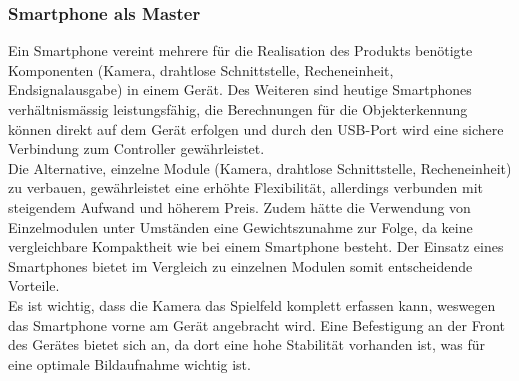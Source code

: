 \subsubsection{Smartphone als Master}
	Ein Smartphone vereint mehrere für die Realisation des Produkts benötigte Komponenten (Kamera, drahtlose Schnittstelle, Recheneinheit, Endsignalausgabe) 
	in einem Gerät. Des Weiteren sind heutige Smartphones verhältnismässig leistungsfähig, die Berechnungen für die Objekterkennung 
	können direkt auf dem Gerät erfolgen und durch den USB-Port wird eine sichere Verbindung zum Controller gewährleistet.\\
	Die Alternative, einzelne Module (Kamera, drahtlose Schnittstelle, Recheneinheit) zu verbauen, 
	gewährleistet eine erhöhte Flexibilität, allerdings verbunden mit steigendem Aufwand und höherem Preis. 
	Zudem hätte die Verwendung von Einzelmodulen unter Umständen eine Gewichtszunahme zur Folge, da keine vergleichbare Kompaktheit wie bei einem Smartphone besteht. 
	Der Einsatz eines Smartphones bietet im Vergleich zu einzelnen Modulen somit entscheidende Vorteile.\\
	Es ist wichtig, dass die Kamera das Spielfeld komplett erfassen kann, weswegen das Smartphone vorne am Gerät angebracht wird. 
	Eine Befestigung an der Front des Gerätes bietet sich an, da dort eine hohe Stabilität vorhanden ist, 
	was für eine optimale Bildaufnahme wichtig ist.\\
	
